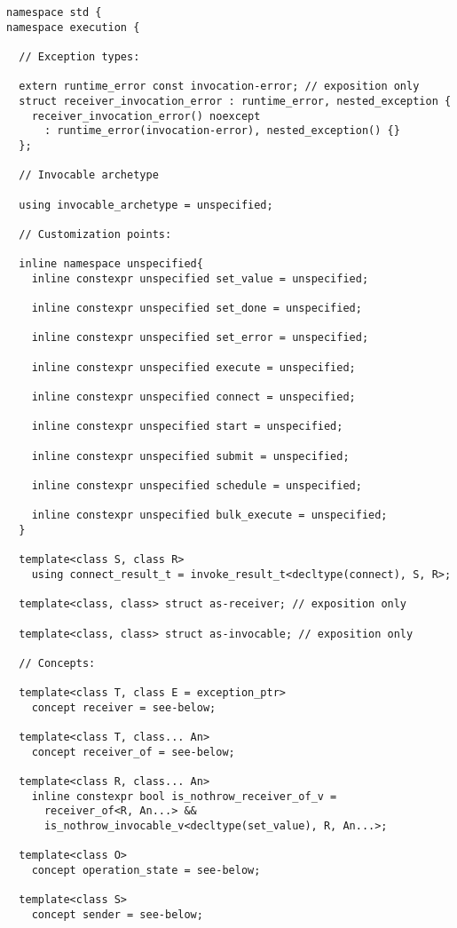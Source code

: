 \documentclass[a4paper,12pt,notitlepage,twoside,openright]{article}
\begin{document}
\begin{verbatim}
namespace std {
namespace execution {

  // Exception types:

  extern runtime_error const invocation-error; // exposition only
  struct receiver_invocation_error : runtime_error, nested_exception {
    receiver_invocation_error() noexcept
      : runtime_error(invocation-error), nested_exception() {}
  };

  // Invocable archetype

  using invocable_archetype = unspecified;

  // Customization points:

  inline namespace unspecified{
    inline constexpr unspecified set_value = unspecified;

    inline constexpr unspecified set_done = unspecified;

    inline constexpr unspecified set_error = unspecified;

    inline constexpr unspecified execute = unspecified;

    inline constexpr unspecified connect = unspecified;

    inline constexpr unspecified start = unspecified;

    inline constexpr unspecified submit = unspecified;

    inline constexpr unspecified schedule = unspecified;

    inline constexpr unspecified bulk_execute = unspecified;
  }

  template<class S, class R>
    using connect_result_t = invoke_result_t<decltype(connect), S, R>;

  template<class, class> struct as-receiver; // exposition only

  template<class, class> struct as-invocable; // exposition only

  // Concepts:

  template<class T, class E = exception_ptr>
    concept receiver = see-below;

  template<class T, class... An>
    concept receiver_of = see-below;

  template<class R, class... An>
    inline constexpr bool is_nothrow_receiver_of_v =
      receiver_of<R, An...> &&
      is_nothrow_invocable_v<decltype(set_value), R, An...>;

  template<class O>
    concept operation_state = see-below;

  template<class S>
    concept sender = see-below;


\end{verbatim}
\end{document}
